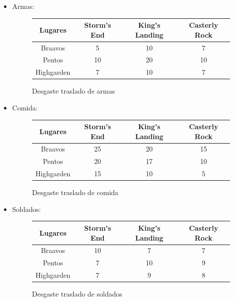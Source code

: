 \documentclass[a4paper,10pt,twocolumn]{article}
\theoremstyle{theorem}
\theoremstyle{definition}
\theoremstyle{remark}
\begin{document}
\begin{itemize}

\item Armas:

\begin{figure}[h!]%
	\begin{center}
		\begin{tabular}{|c|c|c|c|} \hline
		Lugares	& Storm's End		& King's Landing		& Casterly Rock	\\ \hline
		Braavos		& 5			& 10		&  7	\\ \hline
		Pentos		& 10		& 20		& 10	\\ \hline
		Highgarden		& 7			& 10		&  7	\\ \hline
		\end{tabular}
	\caption{Desgaste traslado de armas}\label{fig:ejer_4_1}
	\end{center}
\end{figure}

\item Comida:

\begin{figure}[h!]%
	\begin{center}
		\begin{tabular}{|c|c|c|c|} \hline
		Lugares	& Storm's End		& King's Landing		& Casterly Rock	\\ \hline
		Braavos		& 25		& 20		& 15	\\ \hline
		Pentos		& 20		& 17		& 10	\\ \hline
		Highgarden		& 15		& 10		&  5	\\ \hline
		\end{tabular}
	\caption{Desgaste traslado de comida}\label{fig:ejer_4_2}
	\end{center}
\end{figure}

\item Soldados:

\begin{figure}[h!]%
	\begin{center}
		\begin{tabular}{|c|c|c|c|} \hline
		Lugares	& Storm's End		& King's Landing		& Casterly Rock	\\ \hline
		Braavos		& 10		&  7		&  7	\\ \hline
		Pentos		&  7		& 10		&  9	\\ \hline
		Highgarden		&  7		&  9		&  8	\\ \hline
		\end{tabular}
	\caption{Desgaste traslado de soldados}\label{fig:ejer_4_3}
	\end{center}
\end{figure}


\end{itemize}
\end{document}
